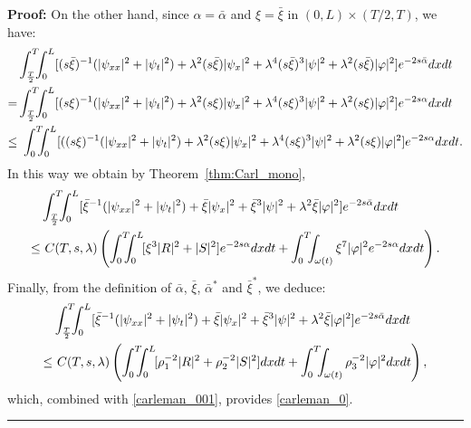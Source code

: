 \documentclass[10pt]{article}
\newenvironment{proof}[1][Proof]
{\noindent\textbf{#1:} }{\hfill\rule{0.5em}{0.5em}}
\def\om{\omega}
\def\\Phivec{\mathbf{\Phi}}
\newcommand{\iiTL}{\int_0^T\!\!\!\!\int_0^L }
\begin{document}
\begin{proof}
	On the other hand, since $\alpha=\bar\alpha$ and $\xi=\bar\xi$ in $(0,L)\times(T/2,T)$, we have:
\begin{align}\label{carleman_002}
		&\int_{T\over2}^T\!\!\!\int_0^L[(s{\bar\xi})^{-1}(|\psi_{xx}|^2+|\psi_t|^2)+\lambda^2(s\bar\xi)|\psi_x|^2
		+\lambda ^4(s\bar\xi)^3|\psi|^2+\lambda ^2 (s\bar\xi)  |\varphi |^2 ]e^{-2s\bar\alpha}dxdt
		 \nonumber\\
		 =&\int_{T\over2}^T\!\!\!\int_0^L[(s{\xi})^{-1}(|\psi_{xx}|^2+|\psi_t|^2)+\lambda^2(s\xi)|\psi_x|^2
		+\lambda ^4(s\xi)^3|\psi|^2+\lambda ^2 (s\xi)  |\varphi |^2 ]e^{-2s\alpha}dxdt
		 \\
		\le &~\iiTL[((s\xi)^{-1}(|\psi_{xx}|^2+|\psi_t|^2)+\lambda^2(s\xi)|\psi_x|^2+\lambda ^4(s\xi)^3|\psi|^2+\lambda ^2 (s\xi)   |\varphi |^2 ]e^{-2s\alpha}dxdt.\nonumber
\end{align}	
	In this way we obtain by Theorem~\ref{thm:Carl_mono},
	\begin{align*}\label{carleman_003}
		&
		\int_{T\over2}^T\!\!\!\int_0^L[{\bar\xi}^{-1}(|\psi_{xx}|^2+|\psi_t|^2)+\bar\xi|\psi_x|^2
		+\bar\xi^3|\psi|^2+\lambda ^2 \bar\xi |\varphi |^2 ]e^{-2s\bar\alpha}dxdt
		 \\
		 \le &~C(T,s,\lambda)
		\left(\iiTL\![\xi^3|R|^2+|S|^2] e^{-2s\alpha} dxdt +
		 \int_0^T \!\!\!\int_{\om(t)} \xi ^7  |\varphi|^2e^{-2s\alpha}  dxdt\right).
\end{align*}	
	Finally, from the definition of $\bar\alpha$, $\bar\xi$, $\bar\alpha^*$ and $\bar\xi^*$, we deduce:
\begin{align*}
		&\int_{T\over2}^T\!\!\!\int_0^L[{\bar\xi}^{-1}(|\psi_{xx}|^2+|\psi_t|^2)+\bar\xi|\psi_x|^2
		+\bar\xi^3|\psi|^2+\lambda ^2 \bar\xi |\varphi |^2 ]e^{-2s\bar\alpha}dxdt
		 \\
		 \le &~C(T,s,\lambda)\left(\iiTL\![\rho_1^{-2}|R|^2+\rho_2^{-2}|S|^2] dxdt +
		 \int_0^T \!\!\!\int_{\om(t)} \rho_3^{-2}|\varphi|^2  dxdt\right),
\end{align*}
	which, combined with \eqref{carleman_001}, provides \eqref{carleman_0}.
\end{proof}

	\
\end{document}
